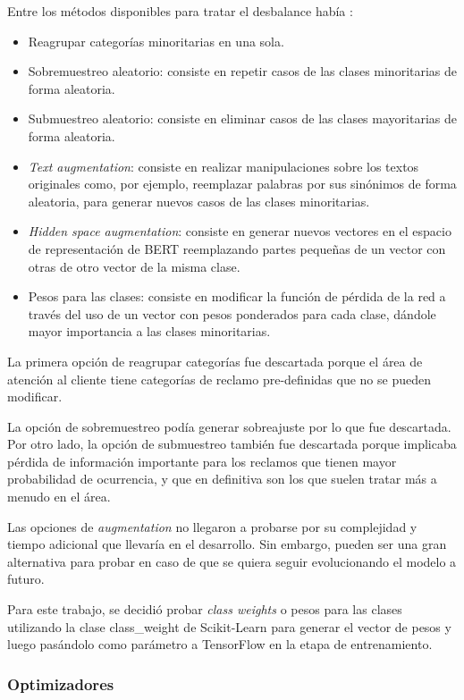 Entre los métodos disponibles para tratar el desbalance había \citep{ARTICLE:7} \citep{WEBSITE:25}:
\begin{itemize}
	\item Reagrupar categorías minoritarias en una sola.
	\item Sobremuestreo aleatorio: consiste en repetir casos de las clases minoritarias de forma aleatoria.
	\item Submuestreo aleatorio: consiste en eliminar casos de las clases mayoritarias de forma aleatoria.
	\item \textit{Text augmentation}: consiste en realizar manipulaciones sobre los textos originales como, por ejemplo, reemplazar palabras por sus sinónimos de forma aleatoria, para generar nuevos casos de las clases minoritarias.
	\item \textit{Hidden space augmentation}: consiste en generar nuevos vectores en el espacio de representación de BERT reemplazando partes pequeñas de un vector con otras de otro vector de la misma clase.
	\item Pesos para las clases: consiste en modificar la función de pérdida de la red a través del uso de un vector con pesos ponderados para cada clase, dándole mayor importancia a las clases minoritarias.
\end{itemize}

La primera opción de reagrupar categorías fue descartada porque el área de atención al cliente tiene categorías de reclamo pre-definidas que no se pueden modificar.

La opción de sobremuestreo podía generar sobreajuste por lo que fue descartada. Por otro lado, la opción de submuestreo también fue descartada porque implicaba pérdida de información importante para los reclamos que tienen mayor probabilidad de ocurrencia, y que en definitiva son los que suelen tratar más a menudo en el área.

Las opciones de \textit{augmentation} no llegaron a probarse por su complejidad y tiempo adicional que llevaría en el desarrollo. Sin embargo, pueden ser una gran alternativa para probar en caso de que se quiera seguir evolucionando el modelo a futuro.

Para este trabajo, se decidió probar \textit{class weights} o pesos para las clases utilizando la clase class\_weight de Scikit-Learn para generar el vector de pesos y luego pasándolo como parámetro a TensorFlow en la etapa de entrenamiento.

\subsubsection{Optimizadores}

